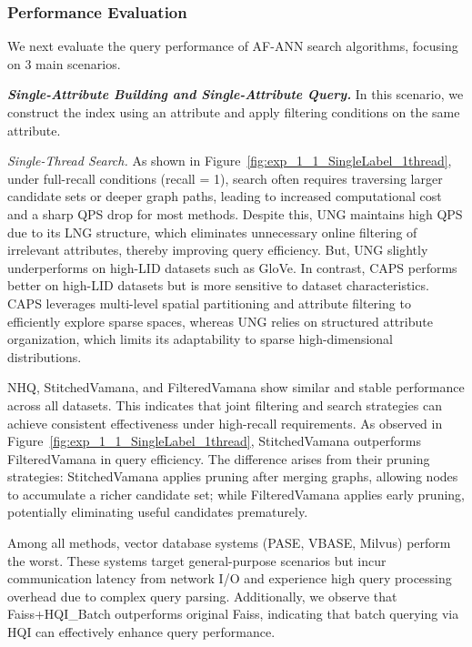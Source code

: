 \documentclass[sigconf, nonacm]{acmart}
\begin{document}
\subsubsection{Performance Evaluation}




We next evaluate the query performance of AF-ANN search algorithms, focusing on 3 main scenarios.

\textit{\textbf{Single-Attribute Building and Single-Attribute Query.}}
In this scenario, we construct the index using an attribute and apply filtering conditions on the same attribute.


\textit{Single-Thread Search.}  
As shown in Figure~\ref{fig:exp_1_1_SingleLabel_1thread}, under full-recall conditions (recall = 1), search often requires traversing larger candidate sets or deeper graph paths, leading to increased computational cost and a sharp QPS drop for most methods. Despite this, UNG maintains high QPS due to its LNG structure, which eliminates unnecessary online filtering of irrelevant attributes, thereby improving query efficiency. But, UNG slightly underperforms on high-LID datasets such as GloVe. In contrast, CAPS performs better on high-LID datasets but is more sensitive to dataset characteristics. CAPS leverages multi-level spatial partitioning and attribute filtering to efficiently explore sparse spaces, whereas UNG relies on structured attribute organization, which limits its adaptability to sparse high-dimensional distributions.

NHQ, StitchedVamana, and FilteredVamana show similar and stable performance across all datasets. This indicates that joint filtering and search strategies can achieve consistent effectiveness under high-recall requirements. As observed in Figure~\ref{fig:exp_1_1_SingleLabel_1thread}, StitchedVamana outperforms FilteredVamana in query efficiency. The difference arises from their pruning strategies: StitchedVamana applies pruning after merging graphs, allowing nodes to accumulate a richer candidate set; while FilteredVamana applies early pruning, potentially eliminating useful candidates prematurely.

Among all methods, vector database systems (PASE, VBASE, Milvus) perform the worst. These systems target general-purpose scenarios but incur communication latency from network I/O and experience high query processing overhead due to complex query parsing. Additionally, we observe that Faiss+HQI\_Batch outperforms original Faiss, indicating that batch querying via HQI can effectively enhance query performance.
\end{document}

